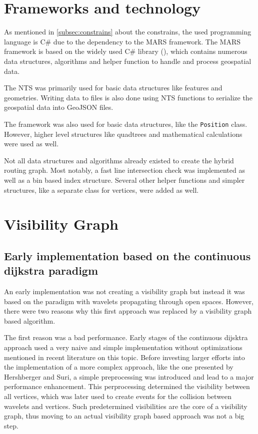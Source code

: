 
\section{Frameworks and technology}

	As mentioned in \cref{subsec:constrains} about the constrains, the used programming language is C\# due to the dependency to the MARS framework.
	The MARS framework is based on the widely used C\# library  (), which contains numerous data structures, algorithms and helper function to handle and process geospatial data.
	
	The NTS was primarily used for basic data structures like features and geometries.
	Writing data to files is also done using NTS functions to serialize the geospatial data into GeoJSON files.
	
	The  framework was also used for basic data structures, like the \texttt{Position} class.
	However, higher level structures like quadtrees and mathematical calculations were used as well.
	
	Not all data structures and algorithms already existed to create the hybrid routing graph.
	Most notably, a fast line intersection check was implemented as well as a bin based index structure.
	Several other helper functions and simpler structures, like a separate class for vertices, were added as well.

\section{Visibility Graph}

	\subsection{Early implementation based on the continuous dijkstra paradigm}
	
		An early implementation was not creating a visibility graph but instead it was based on the  paradigm with wavelets propagating through open spaces.
		However, there were two reasons why this first approach was replaced by a visibility graph based algorithm.
		
		The first reason was a bad performance.
		Early stages of the continuous dijsktra approach used a very naive and simple implementation without optimizations mentioned in recent literature on this topic.
		Before investing larger efforts into the implementation of a more complex approach, like the one presented by Hershberger and Suri\cite{hershberger-suri}, a simple preprocessing was introduced and lead to a major performance enhancement.
		This perprocessing determined the visibility between all vertices, which was later used to create events for the collision between wavelets and vertices.
		Such predetermined visibilities are the core of a visibility graph, thus moving to an actual visibility graph based approach was not a big step.
		

